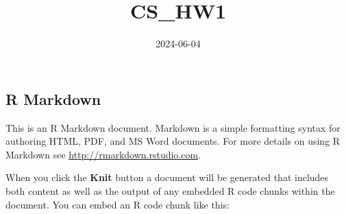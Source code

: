 \documentclass[
]{article}
\title{CS\_HW1}
\author{}
\date{\vspace{-2.5em}2024-06-04}
\begin{document}
\maketitle

\subsection{R Markdown}\label{r-markdown}

This is an R Markdown document. Markdown is a simple formatting syntax
for authoring HTML, PDF, and MS Word documents. For more details on
using R Markdown see \url{http://rmarkdown.rstudio.com}.

When you click the \textbf{Knit} button a document will be generated
that includes both content as well as the output of any embedded R code
chunks within the document. You can embed an R code chunk like this:
\end{document}
